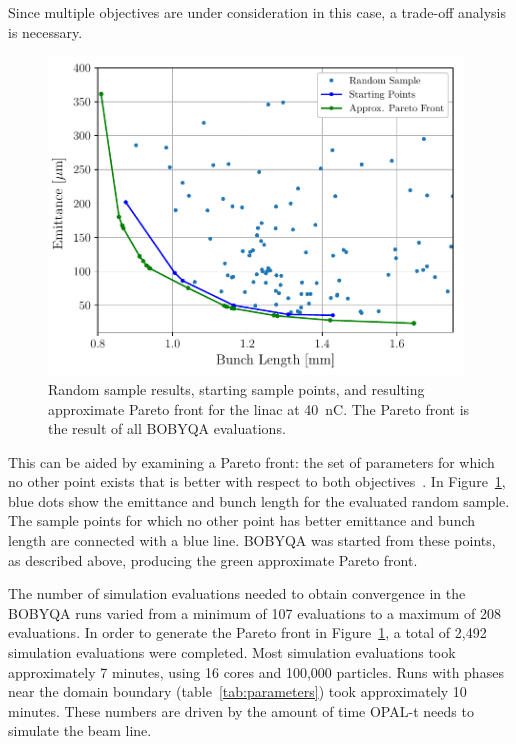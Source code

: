 \documentclass{iitthesis}
\begin{document}
Since multiple objectives are under consideration in this case, a
trade-off analysis is necessary. 
\begin{figure}[h]
	\captionsetup{width=0.98\linewidth}
	\begin{center}
		\includegraphics[width=0.98\textwidth]{images/THPAB155f1}
		\caption{Random sample results, starting sample points, and resulting approximate Pareto front for the linac at \SI{40}{nC}. The Pareto front is the result of all BOBYQA evaluations.}
		\label{fig:pareto}
	\end{center}
\end{figure}
This can be aided by examining a Pareto front: the set of parameters 
for which no other point exists that is better with respect to both objectives~\cite{ehrgott2006multicriteria}.
In Figure~\ref{fig:pareto}, blue dots show the emittance and bunch length for the
evaluated random sample. The sample points for which no other point has better
emittance and bunch length are connected with a blue line. BOBYQA was started
from these points, as described above, producing the green approximate Pareto front. 


The number of simulation evaluations needed to obtain convergence
in the BOBYQA runs varied from a minimum of 107 evaluations to a maximum of 208 
evaluations. In order to generate the Pareto front in
Figure~\ref{fig:pareto}, a total of 2,492 simulation evaluations were completed.
Most simulation evaluations took approximately 7 minutes, using 16 cores and 100,000 particles. 
Runs with phases near the domain boundary
(table~\ref{tab:parameters}) took approximately 10 minutes. These numbers are 
driven by the amount of time OPAL-t needs to simulate the beam line. 
\end{document}
